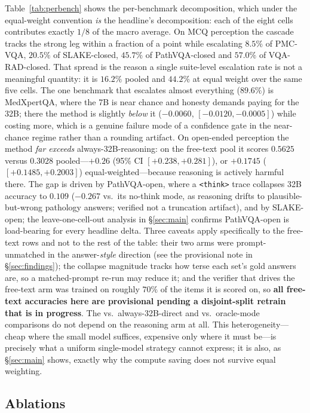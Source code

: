 \documentclass[conference]{IEEEtran}
\begin{document}
Table~\ref{tab:perbench} shows the per-benchmark decomposition, which under the equal-weight convention \emph{is} the headline's decomposition: each of the eight cells contributes exactly $1/8$ of the macro average. On MCQ perception the cascade tracks the strong leg within a fraction of a point while escalating $8.5\%$ of PMC-VQA, $20.5\%$ of SLAKE-closed, $45.7\%$ of PathVQA-closed and $57.0\%$ of VQA-RAD-closed. That spread is the reason a single suite-level escalation rate is not a meaningful quantity: it is $16.2\%$ pooled and $44.2\%$ at equal weight over the same five cells. The one benchmark that escalates almost everything ($89.6\%$) is MedXpertQA, where the 7B is near chance and honesty demands paying for the 32B; there the method is slightly \emph{below} it ($-0.0060$, $[-0.0120,-0.0005]$) while costing more, which is a genuine failure mode of a confidence gate in the near-chance regime rather than a rounding artifact. On open-ended perception the method \emph{far exceeds} always-32B-reasoning: on the free-text pool it scores $0.5625$ versus $0.3028$ pooled---$+0.26$ (95\% CI $[+0.238,+0.281]$), or $+0.1745$ ($[+0.1485,+0.2003]$) equal-weighted---because reasoning is actively harmful there. The gap is driven by PathVQA-open, where a \texttt{<think>} trace collapses 32B accuracy to $0.109$ ($-0.267$ vs.\ its no-think mode, as reasoning drifts to plausible-but-wrong pathology answers; verified not a truncation artifact), and by SLAKE-open; the leave-one-cell-out analysis in \S\ref{sec:main} confirms PathVQA-open is load-bearing for every headline delta. Three caveats apply specifically to the free-text rows and not to the rest of the table: their two arms were prompt-unmatched in the answer-\emph{style} direction (see the provisional note in \S\ref{sec:findings}); the collapse magnitude tracks how terse each set's gold answers are, so a matched-prompt re-run may reduce it; and the verifier that drives the free-text arm was trained on roughly $70\%$ of the items it is scored on, so \textbf{all free-text accuracies here are provisional pending a disjoint-split retrain that is in progress}. The vs.\ always-32B-direct and vs.\ oracle-mode comparisons do not depend on the reasoning arm at all. This heterogeneity---cheap where the small model suffices, expensive only where it must be---is precisely what a uniform single-model strategy cannot express; it is also, as \S\ref{sec:main} shows, exactly why the compute saving does not survive equal weighting.

\subsection{Ablations}\label{sec:ablations}
\end{document}
